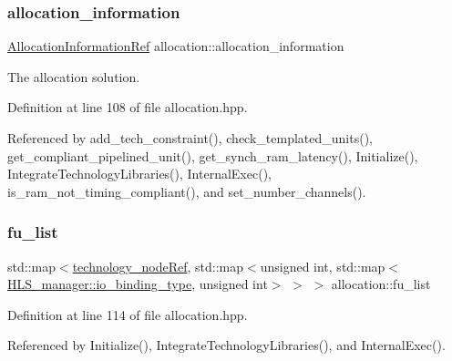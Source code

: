 \subsubsection{\texorpdfstring{allocation\+\_\+information}{allocation\_information}}
{\footnotesize\ttfamily \hyperlink{allocation__information_8hpp_ad90a86da153cba50cbcefc4679036755}{Allocation\+Information\+Ref} allocation\+::allocation\+\_\+information\hspace{0.3cm}{\ttfamily [protected]}}



The allocation solution. 



Definition at line 108 of file allocation.\+hpp.



Referenced by add\+\_\+tech\+\_\+constraint(), check\+\_\+templated\+\_\+units(), get\+\_\+compliant\+\_\+pipelined\+\_\+unit(), get\+\_\+synch\+\_\+ram\+\_\+latency(), Initialize(), Integrate\+Technology\+Libraries(), Internal\+Exec(), is\+\_\+ram\+\_\+not\+\_\+timing\+\_\+compliant(), and set\+\_\+number\+\_\+channels().

\mbox{\label{classallocation_abb3dd63c5df7f47db4f56a5b88e643bf}} 
\subsubsection{\texorpdfstring{fu\+\_\+list}{fu\_list}}
{\footnotesize\ttfamily std\+::map$<$\hyperlink{technology__node_8hpp_a33dd193b7bd6b987bf0d8a770a819fa7}{technology\+\_\+node\+Ref}, std\+::map$<$unsigned int, std\+::map$<$\hyperlink{classHLS__manager_a972627cc658afa992590b9d2bf1a1e87}{H\+L\+S\+\_\+manager\+::io\+\_\+binding\+\_\+type}, unsigned int$>$ $>$ $>$ allocation\+::fu\+\_\+list\hspace{0.3cm}{\ttfamily [protected]}}



Definition at line 114 of file allocation.\+hpp.



Referenced by Initialize(), Integrate\+Technology\+Libraries(), and Internal\+Exec().

\mbox{\label{classallocation_a27ad1d8608f43abd9b719988ddb5095c}} 
